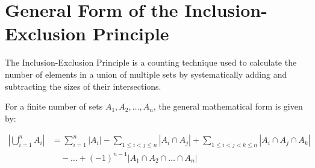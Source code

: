 \documentclass[12pt, a4paper]{article}
\begin{document}
\vspace{0.5cm}

\section{General Form of the Inclusion-Exclusion Principle}
The Inclusion-Exclusion Principle is a counting technique used to calculate the number of elements in a union of multiple sets by systematically adding and subtracting the sizes of their intersections.

For a finite number of sets $A_1, A_2, \dots, A_n$, the general mathematical form is given by:

\begin{align*}
    \left| \bigcup_{i=1}^n A_i \right| &= \sum_{i=1}^n |A_i| - \sum_{1 \le i < j \le n} |A_i \cap A_j| + \sum_{1 \le i < j < k \le n} |A_i \cap A_j \cap A_k| \\
    &\quad - \dots + (-1)^{n-1} |A_1 \cap A_2 \cap \dots \cap A_n|
\end{align*}

\vspace{0.5cm}

\end{document}
